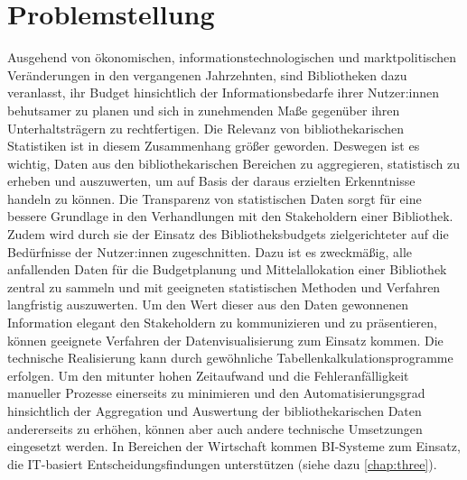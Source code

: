 \section{Problemstellung}
Ausgehend von ökonomischen, informationstechnologischen und marktpolitischen Veränderungen in den
vergangenen Jahrzehnten, sind Bibliotheken dazu veranlasst, ihr Budget hinsichtlich der Informationsbedarfe
ihrer Nutzer:innen behutsamer zu planen und sich in zunehmenden Maße gegenüber ihren Unterhaltsträgern zu rechtfertigen.
Die Relevanz von bibliothekarischen Statistiken ist in diesem Zusammenhang größer geworden.
Deswegen ist es wichtig, Daten aus den bibliothekarischen Bereichen zu aggregieren, statistisch zu erheben und 
auszuwerten, um auf Basis der daraus erzielten Erkenntnisse handeln zu können. 
Die Transparenz von statistischen Daten sorgt für eine bessere Grundlage in den Verhandlungen mit den Stakeholdern
einer Bibliothek. Zudem wird durch sie der Einsatz des Bibliotheksbudgets zielgerichteter auf die Bedürfnisse der Nutzer:innen zugeschnitten.
Dazu ist es zweckmäßig, alle anfallenden Daten für die Budgetplanung und Mittelallokation einer Bibliothek zentral zu sammeln und mit geeigneten 
statistischen Methoden und Verfahren langfristig auszuwerten. Um den Wert dieser aus den Daten gewonnenen Information elegant den Stakeholdern zu kommunizieren und zu präsentieren,
können geeignete Verfahren der Datenvisualisierung zum Einsatz kommen. Die technische Realisierung kann durch gewöhnliche Tabellenkalkulationsprogramme erfolgen.
Um den mitunter hohen Zeitaufwand und die Fehleranfälligkeit manueller Prozesse einerseits zu minimieren und den Automatisierungsgrad hinsichtlich der Aggregation und Auswertung der bibliothekarischen Daten 
andererseits zu erhöhen, können aber auch andere technische Umsetzungen eingesetzt werden. In Bereichen der Wirtschaft kommen \acrfull{BI}-Systeme zum Einsatz, 
die IT-basiert Entscheidungsfindungen unterstützen (siehe dazu \autoref{chap:three}).

